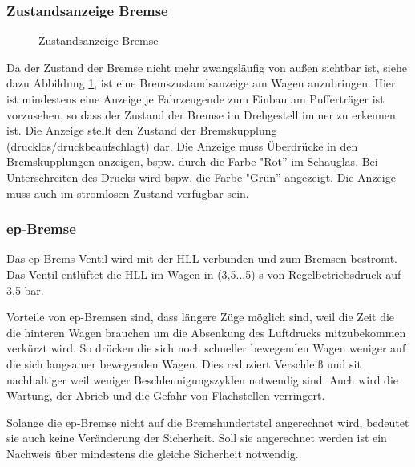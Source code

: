 \subsubsection{Zustandsanzeige Bremse}
\begin{figure}[htbp]
    \centering
    
    \caption{Zustandsanzeige Bremse \cite{ETR_3}}
    \label{fig:ZustandBremse}
\end{figure} 
Da der Zustand der Bremse nicht mehr zwangsläufig von außen sichtbar ist, siehe dazu Abbildung \ref{fig:ZustandBremse}, ist eine Bremszustandsanzeige am Wagen anzubringen. Hier ist mindestens eine Anzeige je Fahrzeugende zum Einbau am Pufferträger ist vorzusehen, so dass
 der Zustand der Bremse im Drehgestell immer zu erkennen ist. Die Anzeige stellt den Zustand der Bremskupplung (drucklos/druckbeaufschlagt) dar. Die Anzeige muss Überdrücke %
 in den Bremskupplungen anzeigen, bspw. durch die Farbe "Rot'' im Schauglas. Bei Unterschreiten des Drucks wird bspw. die Farbe "Grün'' angezeigt. Die Anzeige muss auch im stromlosen Zustand verfügbar sein.

\subsubsection{ep-Bremse}
Das ep-Brems-Ventil wird mit der HLL verbunden und zum Bremsen bestromt. Das Ventil entlüftet die HLL im Wagen in (3,5...5) s von Regelbetriebsdruck auf 3,5 bar.\par
Vorteile von ep-Bremsen sind, dass längere Züge möglich sind, weil die Zeit die die hinteren Wagen brauchen um die Absenkung des Luftdrucks mitzubekommen verkürzt wird. So drücken die sich noch schneller bewegenden Wagen weniger auf die sich langsamer bewegenden Wagen. Dies reduziert Verschleiß und sit nachhaltiger weil weniger Beschleunigungszyklen notwendig sind. Auch wird die Wartung, der Abrieb und die Gefahr von Flachstellen verringert.\par
Solange die ep-Bremse nicht auf die Bremshundertstel angerechnet wird, bedeutet sie auch keine Veränderung der Sicherheit. Soll sie angerechnet werden ist ein Nachweis über mindestens die gleiche Sicherheit notwendig.
